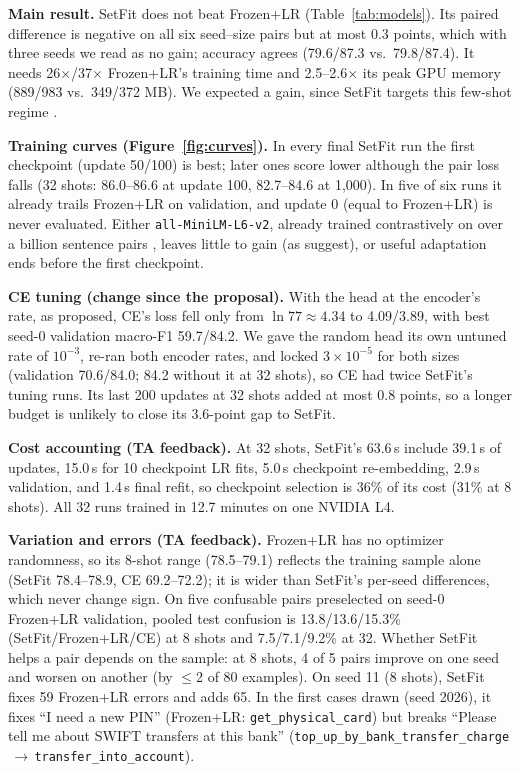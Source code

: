 \documentclass{article}
\begin{document}
\textbf{Main result.} SetFit does not beat Frozen+LR (Table~\ref{tab:models}). Its paired difference is negative on all six seed--size pairs but at most 0.3 points, which with three seeds we read as no gain; accuracy agrees (79.6/87.3 vs.\ 79.8/87.4). It needs 26$\times$/37$\times$ Frozen+LR's training time and 2.5--2.6$\times$ its peak GPU memory (889/983 vs.\ 349/372 MB). We expected a gain, since SetFit targets this few-shot regime \citep{tunstall2022setfit}.

\textbf{Training curves (Figure~\ref{fig:curves}).} In every final SetFit run the first checkpoint (update 50/100) is best; later ones score lower although the pair loss falls (32 shots: 86.0--86.6 at update 100, 82.7--84.6 at 1,000). In five of six runs it already trails Frozen+LR on validation, and update 0 (equal to Frozen+LR) is never evaluated. Either \texttt{all-MiniLM-L6-v2}, already trained contrastively on over a billion sentence pairs \citep{minilm2026}, leaves little to gain (as \citep{ma2022sentence} suggest), or useful adaptation ends before the first checkpoint.

\textbf{CE tuning (change since the proposal).} With the head at the encoder's rate, as proposed, CE's loss fell only from $\ln 77\approx4.34$ to 4.09/3.89, with best seed-0 validation macro-F1 59.7/84.2. We gave the random head its own untuned rate of $10^{-3}$, re-ran both encoder rates, and locked $3\times10^{-5}$ for both sizes (validation 70.6/84.0; 84.2 without it at 32 shots), so CE had twice SetFit's tuning runs. Its last 200 updates at 32 shots added at most 0.8 points, so a longer budget is unlikely to close its 3.6-point gap to SetFit.

\textbf{Cost accounting (TA feedback).} At 32 shots, SetFit's 63.6\,s include 39.1\,s of updates, 15.0\,s for 10 checkpoint LR fits, 5.0\,s checkpoint re-embedding, 2.9\,s validation, and 1.4\,s final refit, so checkpoint selection is 36\% of its cost (31\% at 8 shots). All 32 runs trained in 12.7 minutes on one NVIDIA L4.

\textbf{Variation and errors (TA feedback).} Frozen+LR has no optimizer randomness, so its 8-shot range (78.5--79.1) reflects the training sample alone (SetFit 78.4--78.9, CE 69.2--72.2); it is wider than SetFit's per-seed differences, which never change sign. On five confusable pairs preselected on seed-0 Frozen+LR validation, pooled test confusion is 13.8/13.6/15.3\% (SetFit/Frozen+LR/CE) at 8 shots and 7.5/7.1/9.2\% at 32. Whether SetFit helps a pair depends on the sample: at 8 shots, 4 of 5 pairs improve on one seed and worsen on another (by $\leq$2 of 80 examples). On seed 11 (8 shots), SetFit fixes 59 Frozen+LR errors and adds 65. In the first cases drawn (seed 2026), it fixes ``I need a new PIN'' (Frozen+LR: \texttt{get\_physical\_card}) but breaks ``Please tell me about SWIFT transfers at this bank'' (\texttt{top\_up\_by\_bank\_transfer\_charge}$\,\to\,$\texttt{transfer\_into\_account}).
\end{document}
